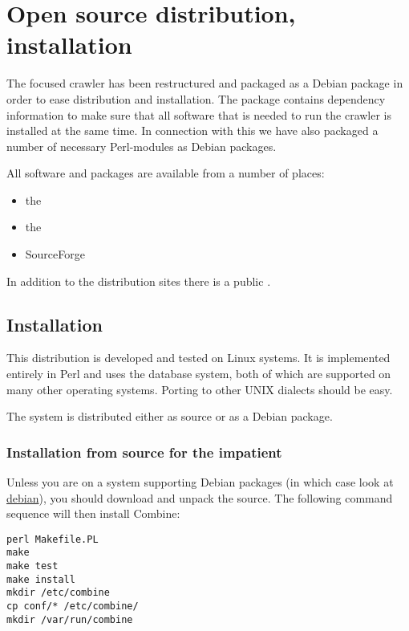 \section{Open source distribution, installation}
\label{distr}
The focused crawler has been restructured and packaged as a Debian
package in order to ease distribution and installation. The package
contains dependency information to make sure that all software that is
needed to run the crawler is installed at the same time. In connection
with this we have also packaged a number of necessary Perl-modules as
Debian packages.

\hspace{-\parindent}All software and packages are available from a number of places:
\begin{itemize}
\item the 
\item the 
\item SourceForge 
\end{itemize}

In addition to the distribution sites there is a public
.

\subsection{Installation}
This distribution is developed and tested on Linux systems.
It is implemented entirely in Perl and uses the 
database system, both of which are supported on many other
operating systems. Porting to other UNIX dialects should be easy.

The system is distributed either as source or as a Debian package.

\subsubsection{Installation from source for the impatient}
Unless you are on a system supporting Debian packages (in which case look at \hyperref{Automated installation}{Automated installation (section }{)}{debian}), you should
download and unpack the source.
The following command sequence will then install Combine:
\begin{verbatim}
perl Makefile.PL
make
make test
make install
mkdir /etc/combine
cp conf/* /etc/combine/
mkdir /var/run/combine
\end{verbatim}

